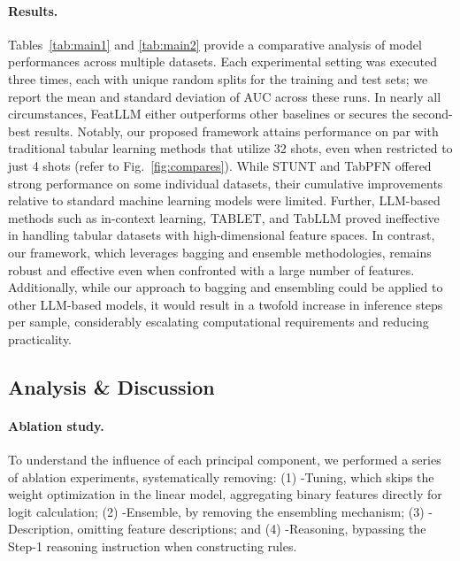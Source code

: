 \vspace*{-0.12in}
\paragraph{Results.}
Tables~\ref{tab:main1} and \ref{tab:main2} provide a comparative analysis of model performances across multiple datasets. Each experimental setting was executed three times, each with unique random splits for the training and test sets; we report the mean and standard deviation of AUC across these runs. In nearly all circumstances, \textsf{FeatLLM} either outperforms other baselines or secures the second-best results. Notably, our proposed framework attains performance on par with traditional tabular learning methods that utilize 32 shots, even when restricted to just 4 shots (refer to Fig.~\ref{fig:compares}). While STUNT and TabPFN offered strong performance on some individual datasets, their cumulative improvements relative to standard machine learning models were limited. Further, LLM-based methods such as in-context learning, TABLET, and TabLLM proved ineffective in handling tabular datasets with high-dimensional feature spaces. In contrast, our framework, which leverages bagging and ensemble methodologies, remains robust and effective even when confronted with a large number of features. Additionally, while our approach to bagging and ensembling could be applied to other LLM-based models, it would result in a twofold increase in inference steps per sample, considerably escalating computational requirements and reducing practicality.

\subsection{Analysis \& Discussion}
\label{sec:analysis}
\paragraph{Ablation study.} To understand the influence of each principal component, we performed a series of ablation experiments, systematically removing: (1) \textsf{-Tuning}, which skips the weight optimization in the linear model, aggregating binary features directly for logit calculation; (2) \textsf{-Ensemble}, by removing the ensembling mechanism; (3) \textsf{-Description}, omitting feature descriptions; and (4) \textsf{-Reasoning}, bypassing the Step-1 reasoning instruction when constructing rules.

